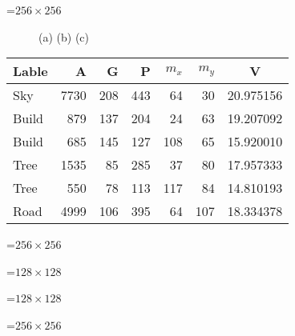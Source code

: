 {\newpage
\clearpage
\samepage \setbox\sizebox=\hbox{$256 \times 256$}\box\sizebox
}

{\newpage
\clearpage
\samepage \begin{figure}\centerline{\hfill {} 
 \hfill {}  
 \hfill {} \hfill }
\centerline{  \hfill (a) \hfill (b)  \hfill (c)\hfill}

\label{fig:build_1}
\end{figure}
}

{\newpage
\clearpage
\samepage \begin{table}\begin{center}
 
\begin{tabular}{||l||r|r|r|r|r|c||} \hline
Lable & A & G & P & $m_x$ &$m_y$  & V \\  \hline
Sky &7730 &208  &443  & 64&30 & 20.975156 \\ 
Build   &879  & 137 & 204 & 24 & 63& 19.207092 \\    
Build  & 685 &  145&  127& 108&  65 &15.920010 \\   
Tree   & 1535&   85 & 285&  37 & 80 &17.957333 \\   
Tree    &550  &  78&  113& 117 & 84& 14.810193 \\   
Road   & 4999&  106&  395&  64 &107& 18.334378 \\   \hline
\end{tabular}
\end{center}
 

\label{tab:hira_know}
\end{table}
}

{\newpage
\clearpage
\samepage \setbox\sizebox=\hbox{$256 \times 256$}\box\sizebox
}

{\newpage
\clearpage
\samepage \setbox\sizebox=\hbox{$128 \times 128 $}\box\sizebox
}

{\newpage
\clearpage
\samepage \setbox\sizebox=\hbox{$128 \times 128 $}\box\sizebox
}

{\newpage
\clearpage
\samepage \setbox\sizebox=\hbox{$256 \times 256$}\box\sizebox
}

